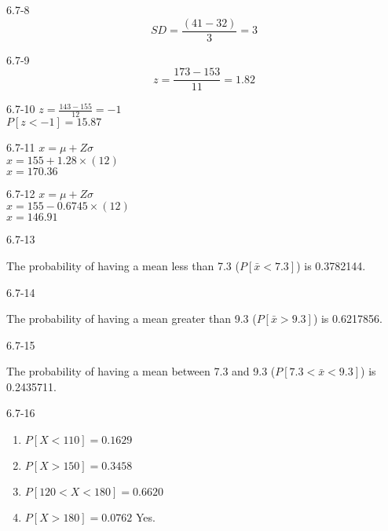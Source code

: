 \begin{exsol@solution}{6.7-8}
	  \begin{equation}
	    SD = \frac{(41 - 32)}{3} = 3
	  \end{equation}
	
\end{exsol@solution}
\begin{exsol@solution}{6.7-9}
	  \begin{equation*}
	    z = \frac{173 - 153}{11} = 1.82
	  \end{equation*}
	
\end{exsol@solution}
\begin{exsol@solution}{6.7-10}
	    $z = \frac{143 - 155}{12} = -1$ \\
	    $P[z < -1] = 15.87$

\end{exsol@solution}
\begin{exsol@solution}{6.7-11}
	    $x = \mu + Z \sigma$ \\
	    $x = 155 + 1.28 \times (12) $ \\
	    $x = 170.36$

\end{exsol@solution}
\begin{exsol@solution}{6.7-12}
	    $x = \mu + Z \sigma$ \\
	    $x = 155 - 0.6745 \times (12) $ \\
	    $x = 146.91$

\end{exsol@solution}
\begin{exsol@solution}{6.7-13}


    The probability of having a mean less than 7.3 ($P[ \bar{x} < 7.3 ]$) is 0.3782144.

\end{exsol@solution}
\begin{exsol@solution}{6.7-14}


    The probability of having a mean greater than 9.3 ($P[ \bar{x} > 9.3 ]$) is 0.6217856.

\end{exsol@solution}
\begin{exsol@solution}{6.7-15}


    The probability of having a mean between 7.3 and  9.3 ($P[ 7.3 < \bar{x} < 9.3 ]$) is 0.2435711.

\end{exsol@solution}
\begin{exsol@solution}{6.7-16}
\begin{enumerate}
\item $P[ X < 110 ] = 0.1629 $
\item $P[ X > 150 ] = 0.3458 $
\item $P[ 120 < X < 180 ] = 0.6620 $
\item $P[ X > 180 ] = 0.0762 $ Yes.
\end{enumerate}

\end{exsol@solution}
